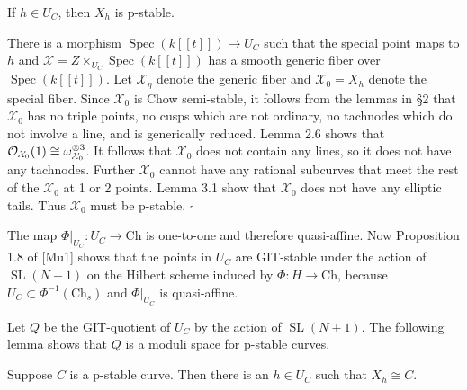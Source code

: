 \documentclass[12pt]{memoir}
\providecommand{\cX}{\mathcal{X}}
\providecommand{\Spec}{\operatorname{Spec}}
\providecommand{\SL}{\operatorname{SL}}
\begin{document}
\begin{Lem}\label{lem:5.2}
If $h \in U_C$, then $X_h$ is p-stable.
\end{Lem}

\begin{ptcbp}
There is a morphism $\Spec(k[[t]]) \to U_C$ such that the special point maps to $h$ and $\cX = Z \times_{U_C} \Spec(k[[t]])$ has a smooth generic fiber over $\Spec(k[[t]])$. Let $\cX_\eta$ denote the generic fiber and $\cX_0 = X_h$ denote the special fiber. Since $\cX_0$ is Chow semi-stable, it follows from the lemmas in \S2 that $\cX_0$ has no triple points, no cusps which are not ordinary, no tachnodes which do not involve a line, and is generically reduced. Lemma 2.6 shows that $\cO_{\cX_0}(1) \cong \om_{\cX_0}^{\otimes 3}$. It follows that $\cX_0$ does not contain any lines, so it does not have any tachnodes. Further $\cX_0$ cannot have any rational subcurves that meet the rest of the $\cX_0$ at 1 or 2 points. Lemma 3.1 show that $\cX_0$ does not have any elliptic tails. Thus $\cX_0$ must be p-stable. \hfill$\square$
\end{ptcbp}

The map $\Phi|_{U_C}\colon U_C \to \mathrm{Ch}$ is one-to-one and therefore quasi-affine. Now Proposition 1.8 of [Mu1] shows that the points in $U_C$ are GIT-stable under the action of $\SL(N+1)$ on the Hilbert scheme induced by $\Phi\colon H \to \mathrm{Ch}$, because $U_C \subset \Phi^{-1}(\mathrm{Ch}_s)$ and $\Phi|_{U_C}$ is quasi-affine.

Let $Q$ be the GIT-quotient of $U_C$ by the action of $\SL(N+1)$. The following lemma shows that $Q$ is a moduli space for p-stable curves.

\begin{Lem}\label{lem:5.3}
Suppose $C$ is a p-stable curve. Then there is an $h \in U_C$ such that $X_h \cong C$.
\end{Lem}
\end{document}
